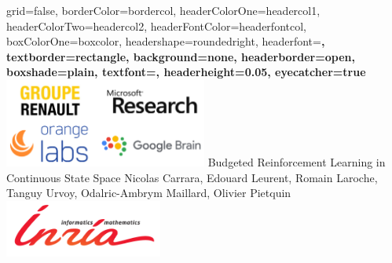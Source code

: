\documentclass[a0paper,portrait,fontscale=0.355, margin=2cm]{baposter}
\begin{document}
\begin{poster}{
grid=false,
borderColor=bordercol, %
headerColorOne=headercol1, %
headerColorTwo=headercol2, %
headerFontColor=headerfontcol, %
boxColorOne=boxcolor, %
headershape=roundedright, %
headerfont=\Large\bf\textsc, %
textborder=rectangle,
background=none,
headerborder=open, %
boxshade=plain,
textfont={\setlength{\parindent}{0.0em}\sffamily},
headerheight={0.05\textheight},
eyecatcher=true
}
%
%
{
\includegraphics[width=18em]{./img/companies}
}
{
Budgeted Reinforcement Learning in Continuous State Space
}
{
Nicolas Carrara, Edouard Leurent, Romain Laroche, \\Tanguy Urvoy, Odalric-Ambrym Maillard, Olivier Pietquin
\vspace{-3\baselineskip}
}
{
\includegraphics[width=14em]{./img/inria_sc}
}

\setlength{\colheight}{0.92\textheight}



\end{poster}
\end{document}
